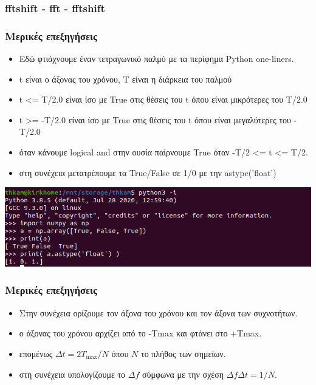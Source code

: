 \documentclass[9pt]{beamer}
\begin{document}
	\begin{frame}
		\frametitle{fftshift - fft - fftshift}
		\begin{multicols}{2}
		
		\end{multicols}
	\end{frame}	

	\begin{frame}
		\frametitle{Μερικές επεξηγήσεις}
		
		\begin{itemize}
			\item Εδώ φτιάχνουμε έναν τετραγωνικό παλμό με τα περίφημα Python one-liners.
			\item t είναι ο άξονας του χρόνου, Τ είναι η διάρκεια του παλμού
			\item t <= T/2.0 είναι ίσο με True στις θέσεις του t όπου είναι μικρότερες του T/2.0
			\item t >= -T/2.0 είναι ίσο με True στις θέσεις του t όπου είναι μεγαλύτερες του -T/2.0
			\item όταν κάνουμε logical and στην ουσία παίρνουμε True όταν -Τ/2 <= t <= T/2.
			\item στη συνέχεια μετατρέπουμε τα True/False σε 1/0 με την astype('float')  
		\end{itemize}
		\centering
		\includegraphics[width=0.7\linewidth]{astypefloat}
	\end{frame}


	\begin{frame}
	\frametitle{Μερικές επεξηγήσεις}
	
	\begin{itemize}
		\item Στην συνέχεια ορίζουμε τον άξονα του χρόνου και τον άξονα των συχνοτήτων.
		\item ο άξονας του χρόνου αρχίζει από το -Τmax και φτάνει στο +Τmax.
		\item επομένως $\Delta t=2T_\mathrm{max}/N$ όπου $N$ το πλήθος των σημείων.  
		\item στη συνέχεια υπολογίζουμε το $\Delta f$ σύμφωνα με την σχέση $\Delta f\Delta t = 1/N$.
	\end{itemize}
	\end{frame}
\end{document}

